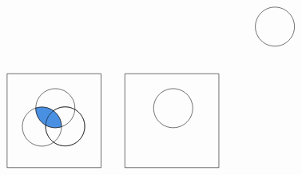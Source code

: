 \documentclass[12pt]{article}
\begin{document}
\[\begin{tikzpicture}[x=0.75pt,y=0.75pt,yscale=-1.08,xscale=1.08]
    \draw   (434,67.96) .. controls (434,56.04) and (443.66,46.38) .. (455.58,46.38) .. controls (467.5,46.38) and (477.16,56.04) .. (477.16,67.96) .. controls (477.16,79.88) and (467.5,89.54) .. (455.58,89.54) .. controls (443.66,89.54) and (434,79.88) .. (434,67.96) -- cycle ;
    \draw   (160,120) -- (263.74,120) -- (263.74,223.74) -- (160,223.74) -- cycle ;
    \draw   (191.7,158.04) .. controls (191.7,146.13) and (201.36,136.47) .. (213.28,136.47) .. controls (225.2,136.47) and (234.86,146.13) .. (234.86,158.04) .. controls (234.86,169.96) and (225.2,179.62) .. (213.28,179.62) .. controls (201.36,179.62) and (191.7,169.96) .. (191.7,158.04) -- cycle ;
    \draw   (176.85,178.42) .. controls (176.85,166.51) and (186.51,156.85) .. (198.42,156.85) .. controls (210.34,156.85) and (220,166.51) .. (220,178.42) .. controls (220,190.34) and (210.34,200) .. (198.42,200) .. controls (186.51,200) and (176.85,190.34) .. (176.85,178.42) -- cycle ;
    \draw   (202.53,178.21) .. controls (202.53,166.29) and (212.19,156.63) .. (224.11,156.63) .. controls (236.03,156.63) and (245.69,166.29) .. (245.69,178.21) .. controls (245.69,190.13) and (236.03,199.79) .. (224.11,199.79) .. controls (212.19,199.79) and (202.53,190.13) .. (202.53,178.21) -- cycle ;
    \draw  [fill={rgb, 255:red, 74; green, 144; blue, 226 }  ,fill opacity=1 ] (213.28,179.62) .. controls (201.36,179.62) and (191.7,169.96) .. (191.7,158.04) .. controls (191.7,158) and (191.7,157.96) .. (191.7,157.91) .. controls (193.82,157.22) and (196.08,156.85) .. (198.42,156.85) .. controls (210.34,156.85) and (220,166.51) .. (220,178.42) .. controls (220,178.47) and (220,178.51) .. (220,178.55) .. controls (217.88,179.25) and (215.63,179.62) .. (213.28,179.62) -- cycle ;
    \draw   (202.53,178.21) .. controls (202.53,166.29) and (212.19,156.63) .. (224.11,156.63) .. controls (236.03,156.63) and (245.69,166.29) .. (245.69,178.21) .. controls (245.69,190.13) and (236.03,199.79) .. (224.11,199.79) .. controls (212.19,199.79) and (202.53,190.13) .. (202.53,178.21) -- cycle ;
    \draw   (290,120) -- (393.74,120) -- (393.74,223.74) -- (290,223.74) -- cycle ;
    \draw   (321.7,158.04) .. controls (321.7,146.13) and (331.36,136.47) .. (343.28,136.47) .. controls (355.2,136.47) and (364.86,146.13) .. (364.86,158.04) .. controls (364.86,169.96) and (355.2,179.62) .. (343.28,179.62) .. controls (331.36,179.62) and (321.7,169.96) .. (321.7,158.04) -- cycle ;

\end{tikzpicture}\]
\end{document}
